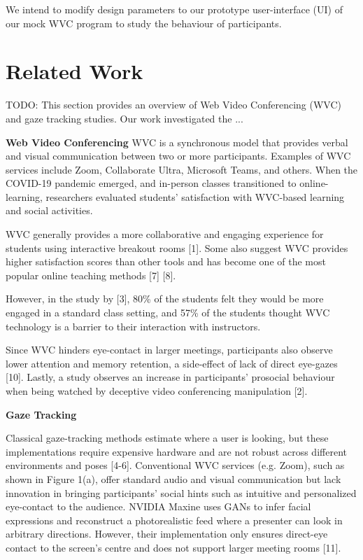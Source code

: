 \documentclass[sigconf,authordraft]{acmart}
\begin{document}
 We intend to modify design parameters to our prototype user-interface (UI) of our mock WVC program  to study the behaviour of participants. 

\section{Related Work}
TODO: 
This section provides an overview of Web Video Conferencing (WVC) and gaze tracking studies. Our work investigated the ...

\textbf{Web Video Conferencing}
\newline
WVC is a synchronous model that provides verbal and visual communication between two or more participants. Examples of WVC services include Zoom, Collaborate Ultra, Microsoft Teams, and others. When the COVID-19 pandemic emerged, and in-person classes transitioned to online-learning, researchers evaluated students’ satisfaction with WVC-based learning and social activities.

WVC generally provides a more collaborative and engaging experience for students using interactive breakout rooms [1]. Some also suggest WVC provides higher satisfaction scores than other tools and has become one of the most popular online teaching methods [7] [8]. 

However, in the study by [3], 80\% of the students felt they would be more engaged in a standard class setting, and 57\% of the students thought WVC technology is a barrier to their interaction with instructors. 

Since WVC hinders eye-contact in larger meetings, participants also observe lower attention and memory retention, a side-effect of lack of direct eye-gazes [10]. Lastly, a study observes an increase in participants’ prosocial behaviour when being watched by deceptive video conferencing manipulation [2]. 
\newline

\textbf{Gaze Tracking}
\newline

Classical gaze-tracking methods estimate where a user is looking, but these implementations require expensive hardware and are not robust across different environments and poses [4-6]. Conventional WVC services (e.g. Zoom), such as shown in Figure 1(a), offer standard audio and visual communication but lack innovation in bringing participants’ social hints such as intuitive and personalized eye-contact to the audience. NVIDIA Maxine uses GANs to infer facial expressions and reconstruct a photorealistic feed where a presenter can look in arbitrary directions. However, their implementation only ensures direct-eye contact to the screen’s centre and does not support larger meeting rooms [11]. 
\end{document}
